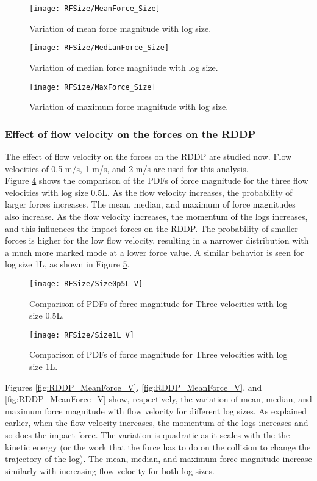 \begin{figure}
\centering
\texttt{[image: RFSize/MeanForce\_Size]}
\caption{\label{fig:RFMeanForce_Size}Variation of mean force magnitude with log size.}
\end{figure} 
\begin{figure}
\centering
\texttt{[image: RFSize/MedianForce\_Size]}
\caption{\label{fig:RFMedianForce_Size}Variation of median force magnitude with log size.}
\end{figure} 
\begin{figure}
\centering
\texttt{[image: RFSize/MaxForce\_Size]}
\caption{\label{fig:RFMaxForce_Size}Variation of maximum force magnitude with log size.}
\end{figure} 
\FloatBarrier
\subsubsection{Effect of flow velocity on the forces on the RDDP}
The effect of flow velocity on the forces on the RDDP are studied now. Flow velocities of 0.5 m/s, 1 m/s, and 2 m/s are used for this analysis.\\
Figure \ref{fig:RFSize0p5L_V} shows the comparison of the PDFs of force magnitude for the three flow velocities with log size 0.5L. As the flow velocity increases, the probability of larger forces increases. The mean, median, and maximum of force magnitudes also increase. As the flow velocity increases, the momentum of the logs increases, and this influences the impact forces on the RDDP. The probability of smaller forces is higher for the low flow velocity, resulting in a narrower distribution with a much more marked mode at a lower force value. A similar behavior is seen for log size 1L, as shown in Figure \ref{fig:RFSize1L_V}.

\begin{figure}
\centering
\texttt{[image: RFSize/Size0p5L\_V]}
\caption{\label{fig:RFSize0p5L_V}Comparison of PDFs of force magnitude for Three velocities with log size 0.5L.}
\end{figure} 
\begin{figure}
\centering
\texttt{[image: RFSize/Size1L\_V]}
\caption{\label{fig:RFSize1L_V}Comparison of PDFs of force magnitude for Three velocities with log size 1L.}
\end{figure}

\noindent Figures \ref{fig:RDDP_MeanForce_V}, \ref{fig:RDDP_MeanForce_V}, and \ref{fig:RDDP_MeanForce_V} show, respectively, the variation of mean, median, and maximum force magnitude with flow velocity for different log sizes. As explained earlier, when the flow velocity increases, the momentum of the logs increases and so does the impact force. The variation is quadratic as it scales with the the kinetic energy (or the work that the force has to do on the collision to change the trajectory of the log). The mean, median, and maximum force magnitude increase similarly with increasing flow velocity for both log sizes. 

